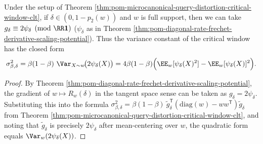 \begin{corollary}\label{cor:pom-microcanonical-query-distortion-critical-window-variance-psi}
Under the setup of Theorem \ref{thm:pom-microcanonical-query-distortion-critical-window-clt}, if \(\delta\in(0,1-p_2(w))\) and \(w\) is full support, then we can take
\(
g_\delta\equiv 2\psi_\delta\pmod{\RR\mathbf 1}
\)
(\(\psi_\delta\) as in Theorem \ref{thm:pom-diagonal-rate-frechet-derivative-scaling-potential}).
Thus the variance constant of the critical window has the closed form
\[
\sigma_{\beta,\delta}^2
=\beta(1-\beta)\ \Var_{X\sim w}\!\bigl(2\psi_\delta(X)\bigr)
=4\beta(1-\beta)\Bigl(\EE_w[\psi_\delta(X)^2]-\EE_w[\psi_\delta(X)]^2\Bigr).
\]
\end{corollary}
\begin{proof}
By Theorem \ref{thm:pom-diagonal-rate-frechet-derivative-scaling-potential}, the gradient of \(w\mapsto R_w(\delta)\) in the tangent space sense can be taken as \(g_\delta=2\psi_\delta\).
Substituting this into the formula
\(
\sigma_{\beta,\delta}^2=\beta(1-\beta)\ \widetilde g_\delta^{\mathsf T}(\mathrm{diag}(w)-ww^{\mathsf T})\widetilde g_\delta
\)
from Theorem \ref{thm:pom-microcanonical-query-distortion-critical-window-clt},
and noting that \(\widetilde g_\delta\) is precisely \(2\psi_\delta\) after mean-centering over \(w\), the quadratic form equals \(\Var_w(2\psi_\delta(X))\).
\end{proof}


\endinput






